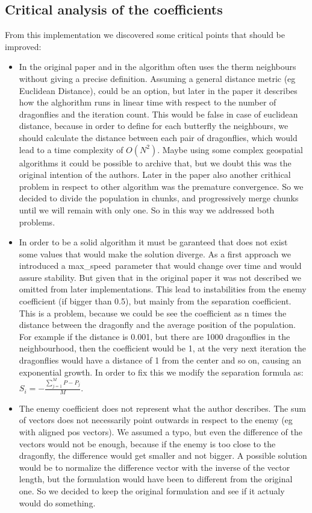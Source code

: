 \documentclass[10pt]{article}
\begin{document}
\begin{multicols}{2}
\section{Critical analysis of the coefficients}
From this implementation we discovered some critical points that should be improved:
\begin{itemize}
  \item In the original paper\cite{Original} and in the algorithm often uses the therm neighbours without giving a precise definition.
  Assuming a general distance metric (eg Euclidean Distance), could be an option, but later in the paper it describes how the alghorithm runs in linear time with respect to the number of dragonflies and the iteration count.
  This would be false in case of euclidean distance, because in order to define for each butterfly the neighbours, we should calculate the distance between each pair of dragonflies, which would lead to a time complexity of $O(N^2)$.
  Maybe using some complex geospatial algorithms it could be possible to archive that, but we doubt this was the original intention of the authors.
  Later in the paper also another crithical problem in respect to other algorithm was the premature convergence. So we decided to divide the population in chunks, and progressively merge chunks until we will remain with only one.
  So in this way we addressed both problems.
  \item In order to be a solid algorithm it must be garanteed that does not exist some values that would make the solution diverge.
  As a first approach we introduced a max\_speed\ parameter that would change over time and would assure stability. 
  But given that in the original paper it was not described we omitted from later implementations.
  This lead to instabilities from the enemy coefficient (if bigger than 0.5), but mainly from the separation coefficient.
  This is a problem, because we could be see the coefficient as n times the distance between the dragonfly and the average position of the population. For example if the distance is 0.001, 
  but there are 1000 dragonflies in the neighbourhood, then the coefficient would be 1, at the very next iteration the dragonflies would have a distance of 1 from the center and so on, causing an exponential growth.
  In order to fix this we modify the separation formula as: $S_i = - \frac{\sum^M_{j=1}{P - P_j}}{M}$.

  \item  The enemy coefficient does not represent what the author describes. The sum of vectors does not necessarily point outwards in respect to the enemy (eg with aligned pos vectors). 
  We assumed a typo, but even the difference of the vectors would not be enough, because if the enemy is too close to the dragonfly, the difference would get smaller and not bigger.
  A possible solution would be to normalize the difference vector with the inverse of the vector length, but the formulation would have been to different from the original one. So we decided to keep the original formulation and see if it actualy would do something.
\end{itemize}



\end{multicols}
\end{document}
